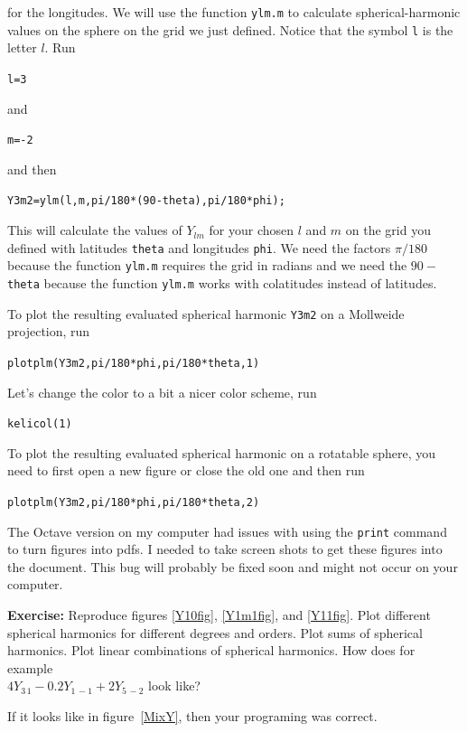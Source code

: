 \documentclass[11pt]{article}
\newcommand{\Yfun}{Y}
\begin{document}
for the longitudes. We will use the function \verb+ylm.m+ to
calculate spherical-harmonic values on the sphere on the grid we just
defined. Notice that the symbol \verb+l+ is the letter $l$. Run

\qquad \verb+l=3+ 

and 

\qquad \verb+m=-2+

and then 

\qquad \verb+Y3m2=ylm(l,m,pi/180*(90-theta),pi/180*phi);+

This will calculate the values of $\Yfun_{lm}$ for your chosen $l$ and
$m$ on the grid you defined with latitudes \verb+theta+ and longitudes
\verb+phi+. We need the factors $\pi/180$ because the function
\verb+ylm.m+ requires the grid in radians and we need the $90-$
\verb+theta+ because the function \verb+ylm.m+ works with colatitudes
instead of latitudes.

To plot the resulting evaluated spherical harmonic \verb+Y3m2+ on a
Mollweide projection, run
  
\qquad \verb+plotplm(Y3m2,pi/180*phi,pi/180*theta,1)+

Let's change the color to a bit a nicer color scheme, run

\quad \verb+kelicol(1)+


To plot the resulting evaluated spherical harmonic on a rotatable
sphere, you need to first open a new figure or close the old one and
then run

\qquad \verb+plotplm(Y3m2,pi/180*phi,pi/180*theta,2)+

The Octave version on my computer had issues with using the
\verb+print+ command to turn figures into pdfs. I needed to take
screen shots to get these figures into the document. This bug will
probably be fixed soon and might not occur on your computer.

\textbf{Exercise:} Reproduce figures \ref{Y10fig}, \ref{Y1m1fig}, and \ref{Y11fig}. Plot different spherical harmonics for different degrees and orders. Plot sums of spherical harmonics. Plot linear combinations of spherical harmonics. How does for example \\{$4\Yfun_{3\,1} - 0.2\Yfun_{1\,-1} +2\Yfun_{5\,-2}$} look like?

If it looks like in figure~\ref{MixY}, then your programing was
correct.
\end{document}
